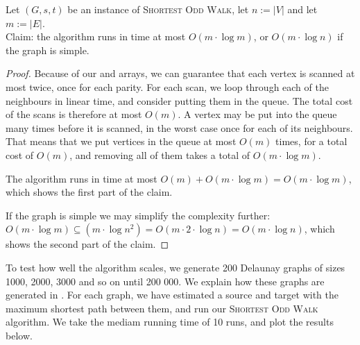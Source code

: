 






\begin{theorem}
    Let $(G,s,t)$ be an instance of \textsc{Shortest Odd Walk}, let $n := |V|$ and let $m := |E|$.\\
    Claim: the algorithm runs in time at most $O(m \cdot \log m)$, or $O(m \cdot \log n)$ if the graph is simple.
    \begin{proof}
        Because of our  and  arrays, we can guarantee that each vertex is scanned at most twice, once for each parity. For each scan, we loop through each of the neighbours in linear time, and consider putting them in the queue. The total cost of the scans is therefore at most $O(m)$. A vertex may be put into the queue many times before it is scanned, in the worst case once for each of its neighbours. That means that we put vertices in the queue at most $O(m)$ times, for a total cost of $O(m)$, and removing all of them takes a total of $O(m \cdot \log m)$. 
        
        The algorithm runs in time at most $O(m) + O(m \cdot \log m) = O(m \cdot \log m)$, which shows the first part of the claim.
        
        If the graph is simple we may simplify the complexity further: $O(m \cdot \log m) \subseteq (m \cdot \log n^2) = O(m \cdot 2 \cdot \log n) = O(m \cdot \log n)$, which shows the second part of the claim.
    \end{proof}
\end{theorem}

To test how well the algorithm scales, we generate 200 Delaunay graphs of sizes 1000, 2000, 3000 and so on until 200 000. We explain how these graphs are generated in . For each graph, we have estimated a source and target with the maximum shortest path between them, and run our \textsc{Shortest Odd Walk} algorithm. We take the mediam running time of 10 runs, and plot the results below.

